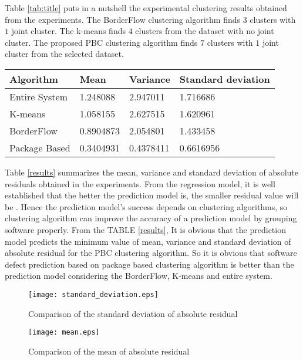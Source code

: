 \documentclass[12pt]{report}
\begin{document}
Table \ref{tab:title} puts in a nutshell the experimental clustering results obtained from the experiments. The BorderFlow clustering algorithm finds $3$ clusters with $1$ joint cluster. The k-means finds $4$ clusters from the dataset with no joint cluster. The proposed PBC clustering algorithm finds $7$ clusters with $1$ joint cluster from the selected dataset.

\begin{center}
\centering
{} \label{results} 
    \begin{tabular}{ | p{3cm} | p{3cm} | p{3cm} |p{3cm}|}
			\hline
				Algorithm &	Mean	& Variance &	Standard deviation \\ \hline
				Entire System&	1.248088 &	2.947011 &	1.716686\\ \hline
				K-means	& 1.058155 &	2.627515 &	1.620961 \\ \hline
				BorderFlow &	0.8904873	& 2.054801	& 1.433458 \\ \hline
				Package Based &	0.3404931 &	0.4378411 &	0.6616956\\ 
			\hline
    \end{tabular}
\end{center}

Table \ref{results} summarizes the mean, variance and standard deviation of absolute residuals obtained in the experiments. From the regression model, it is well established that the better the prediction model is, the smaller residual value will be \cite{draper1981applied}. Hence the prediction model's success depends on clustering algorithms, so clustering algorithm can improve the accuracy of a prediction model by grouping software properly. From the TABLE \ref{results}, It is obvious that the prediction model predicts the minimum value of mean, variance and standard deviation of absolute residual for the PBC clustering algorithm. So it is obvious that software defect prediction based on package based clustering algorithm is better than the prediction model considering the BorderFlow, K-means and entire system.
 
 \begin{figure}[ht!]
  \centering
    \texttt{[image: standard\_deviation.eps]}
		\caption{Comparison of the standard deviation of absolute residual}
		\label{StandardDeviation}
\end{figure}


\begin{figure}[h!]
\centering
     \texttt{[image: mean.eps]}
		 \caption{Comparison of the mean of absolute residual}
		\label{MeanAbsoluteResidual}
\end{figure}
\end{document}
